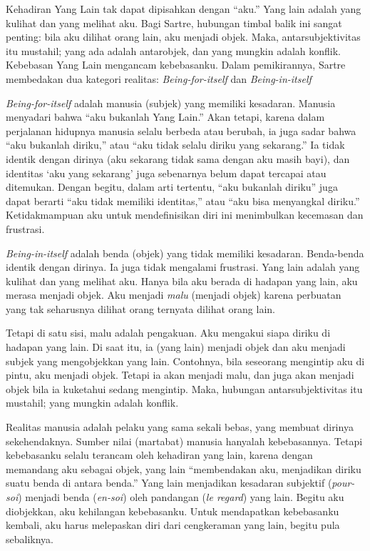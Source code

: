 \documentclass[11pt,twoside,a5paper,openany]{memoir}
\begin{document}
Kehadiran Yang Lain tak dapat dipisahkan dengan ``aku.'' Yang lain
adalah yang kulihat dan yang melihat aku. Bagi Sartre, hubungan timbal
balik ini sangat penting: bila aku dilihat orang lain, aku menjadi
objek. Maka, antarsubjektivitas itu mustahil; yang ada adalah
antarobjek, dan yang mungkin adalah konflik. Kebebasan Yang Lain
mengancam kebebasanku. Dalam pemikirannya, Sartre membedakan dua
kategori realitas: \emph{Being-for-itself} dan \emph{Being-in-itself}

\emph{Being-for-itself} adalah manusia (subjek) yang memiliki kesadaran.
Manusia menyadari bahwa ``aku bukanlah Yang Lain.'' Akan tetapi, karena
dalam perjalanan hidupnya manusia selalu berbeda atau berubah, ia juga
sadar bahwa ``aku bukanlah diriku,'' atau ``aku tidak selalu diriku yang
sekarang.'' Ia tidak identik dengan dirinya (aku sekarang tidak sama
dengan aku masih bayi), dan identitas `aku yang sekarang' juga
sebenarnya belum dapat tercapai atau ditemukan. Dengan begitu, dalam
arti tertentu, ``aku bukanlah diriku'' juga dapat berarti ``aku tidak
memiliki identitas,'' atau ``aku bisa menyangkal diriku.''
Ketidakmampuan aku untuk mendefinisikan diri ini menimbulkan kecemasan
dan frustrasi.

\emph{Being-in-itself} adalah benda (objek) yang tidak memiliki
kesadaran. Benda-benda identik dengan dirinya. Ia juga tidak mengalami
frustrasi. Yang lain adalah yang kulihat dan yang melihat aku. Hanya
bila aku berada di hadapan yang lain, aku merasa menjadi objek. Aku
menjadi \emph{malu} (menjadi objek) karena perbuatan yang tak seharusnya
dilihat orang ternyata dilihat orang lain.

Tetapi di satu sisi, malu adalah pengakuan. Aku mengakui siapa diriku di
hadapan yang lain. Di saat itu, ia (yang lain) menjadi objek dan aku
menjadi subjek yang mengobjekkan yang lain. Contohnya, bila seseorang
mengintip aku di pintu, aku menjadi objek. Tetapi ia akan menjadi malu,
dan juga akan menjadi objek bila ia kuketahui sedang mengintip. Maka,
hubungan antarsubjektivitas itu mustahil; yang mungkin adalah konflik.

Realitas manusia adalah pelaku yang sama sekali bebas, yang membuat
dirinya sekehendaknya. Sumber nilai (martabat) manusia hanyalah
kebebasannya. Tetapi kebebasanku selalu terancam oleh kehadiran yang
lain, karena dengan memandang aku sebagai objek, yang lain ``membendakan
aku, menjadikan diriku suatu benda di antara benda.'' Yang lain
menjadikan kesadaran subjektif (\emph{pour-soi}) menjadi benda
(\emph{en-soi}) oleh pandangan (\emph{le regard}) yang lain. Begitu aku
diobjekkan, aku kehilangan kebebasanku. Untuk mendapatkan kebebasanku
kembali, aku harus melepaskan diri dari cengkeraman yang lain, begitu
pula sebaliknya.
\end{document}
